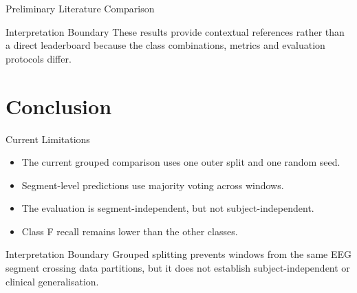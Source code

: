 \documentclass{beamer}
\begin{document}
\begin{frame}{Preliminary Literature Comparison}
  \begin{table}
    \centering
    \scriptsize
  \end{table}

  \begin{block}{Interpretation Boundary}
    These results provide contextual references rather than a direct
    leaderboard because the class combinations, metrics and evaluation
    protocols differ.
  \end{block}
 \end{frame}

\section{Conclusion}
\begin{frame}{Current Limitations}
  \begin{itemize}
    \item The current grouped comparison uses one outer split and one random seed.
    \item Segment-level predictions use majority voting across windows.
    \item The evaluation is segment-independent, but not subject-independent.
    \item Class F recall remains lower than the other classes.
  \end{itemize}

  \begin{block}{Interpretation Boundary}
    Grouped splitting prevents windows from the same EEG segment crossing
    data partitions, but it does not establish subject-independent or clinical generalisation.
  \end{block}
\end{frame}
\end{document}
